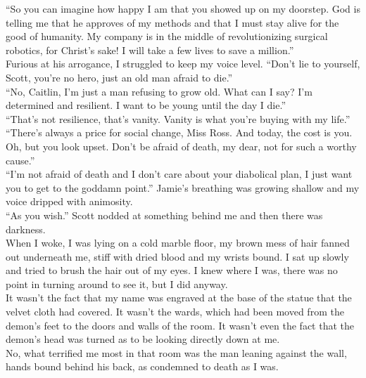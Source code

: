 \documentclass[a5paper]{scrartcl}
\begin{document}
\enquote{So you can imagine how happy I am that you showed up on my doorstep.  God is telling me that he approves of my methods and that I must stay alive for the good of humanity. My company is in the middle of revolutionizing surgical robotics, for Christ's sake! I will take a few lives to save a million.}\\


Furious at his arrogance, I struggled to keep my voice level. \enquote{Don't lie to yourself, Scott, you're no hero, just an old man afraid to die.}\\


\enquote{No, Caitlin, I'm just a man refusing to grow old. What can I say? I'm determined and resilient.  I want to be young until the day I die.}\\


\enquote{That's not resilience, that's vanity. Vanity is what you're buying with my life.} \\


\enquote{There's always a price for social change, Miss Ross. And today, the cost is you. Oh, but you look upset. Don't be afraid of death, my dear, not for such a worthy cause.}\\


\enquote{I'm not afraid of death and I don't care about your diabolical plan, I just want you to get to the goddamn point.} Jamie's breathing was growing shallow and my voice dripped with animosity.\\


\enquote{As you wish.} Scott nodded at something behind me and then there was darkness.\\


When I woke, I was lying on a cold marble floor, my brown mess of hair fanned out underneath me, stiff with dried blood and my wrists bound. I sat up slowly and tried to brush the hair out of my eyes. I knew where I was, there was no point in turning around to see it, but I did anyway.\\


It wasn't the fact that my name was engraved at the base of the statue that the velvet cloth had covered. It wasn't the wards, which had been moved from the demon's feet to the doors and walls of the room. It wasn't even the fact that the demon's head was turned as to be looking directly down at me.\\


No, what terrified me most in that room was the man leaning against the wall, hands bound behind his back, as condemned to death as I was.\\
\end{document}
